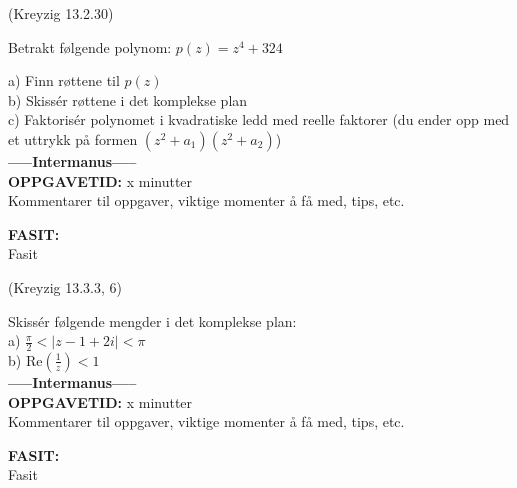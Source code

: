 \documentclass[a4paper,norsk,11pt]{style_interaktiv}
\begin{document}
\begin{oppgave}{3}
(Kreyzig 13.2.30)

Betrakt følgende polynom: $p(z) = z^4 + 324$

a) Finn røttene til $p(z)$\\
b) Skissér røttene i det komplekse plan\\
c) Faktorisér polynomet i kvadratiske ledd med reelle faktorer (du ender opp med et uttrykk på formen $(z^2+a_1)(z^2+a_2)$)\\

\if{}
\textbf{-----Intermanus-----}\\
\textbf{OPPGAVETID: } x minutter\\
Kommentarer til oppgaver, viktige momenter å få med, tips, etc.

\textbf{FASIT: }\\
Fasit
\fi
\end{oppgave}

\begin{oppgave}{4}
(Kreyzig 13.3.3, 6)

Skissér følgende mengder i det komplekse plan:\\
a) $\frac{\pi}{2} < | z - 1 + 2i | < \pi$\\
b) $\mathrm{Re} (\frac{1}{z}) < 1$\\

\if{}
\textbf{-----Intermanus-----}\\
\textbf{OPPGAVETID: } x minutter\\
Kommentarer til oppgaver, viktige momenter å få med, tips, etc.

\textbf{FASIT: }\\
Fasit
\fi
\end{oppgave}
\end{document}
